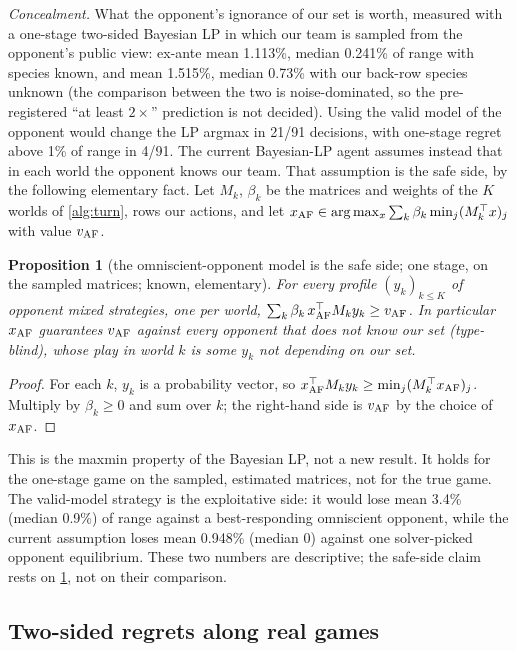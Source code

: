 \documentclass[10pt]{article}
\theoremstyle{plain}
\newtheorem{proposition}[theorem]{Proposition}
\theoremstyle{definition}
\theoremstyle{remark}
\begin{document}
\emph{Concealment.} What the opponent's ignorance of our set is worth, measured with a one-stage two-sided Bayesian LP
in which our team is sampled from the opponent's public view: ex-ante mean 1.113\%, median 0.241\% of range with species
known, and mean 1.515\%, median 0.73\% with our back-row species unknown (the comparison between the two is
noise-dominated, so the pre-registered ``at least $2\times$'' prediction is not decided). Using the valid model of the
opponent would change the LP argmax in 21/91 decisions, with one-stage regret above 1\% of range in 4/91. The current
Bayesian-LP agent assumes instead that in each world the opponent knows our team. That assumption is the safe side, by the
following elementary fact. Let $M_k$, $\beta_k$ be the matrices and weights of the $K$ worlds of \cref{alg:turn}, rows our
actions, and let $x_{\rm AF}\in\arg\max_x\sum_k\beta_k\min_j(M_k^\top x)_j$ with value $v_{\rm AF}$.
\begin{proposition}[the omniscient-opponent model is the safe side; one stage, on the sampled matrices; known, elementary]\label{prop:maxmin}
For every profile $(y_k)_{k\le K}$ of opponent mixed strategies, one per world,
$\sum_k\beta_k\,x_{\rm AF}^\top M_ky_k\ge v_{\rm AF}$. In particular $x_{\rm AF}$ guarantees $v_{\rm AF}$ against every opponent
that does not know our set (type-blind), whose play in world $k$ is some $y_k$ not depending on our set.
\end{proposition}
\begin{proof}
For each $k$, $y_k$ is a probability vector, so $x_{\rm AF}^\top M_ky_k\ge\min_j(M_k^\top x_{\rm AF})_j$. Multiply by
$\beta_k\ge0$ and sum over $k$; the right-hand side is $v_{\rm AF}$ by the choice of $x_{\rm AF}$.
\end{proof}
This is the maxmin property of the Bayesian LP, not a new result. It holds for the one-stage game on the sampled,
estimated matrices, not for the true game. The valid-model strategy is the exploitative side: it would lose mean 3.4\%
(median 0.9\%) of range against a best-responding omniscient opponent, while the current assumption loses mean 0.948\%
(median 0) against one solver-picked opponent equilibrium. These two numbers are descriptive; the safe-side claim rests on
\cref{prop:maxmin}, not on their comparison.

\subsection{Two-sided regrets along real games}\label{sec:bench-cce}
\end{document}
